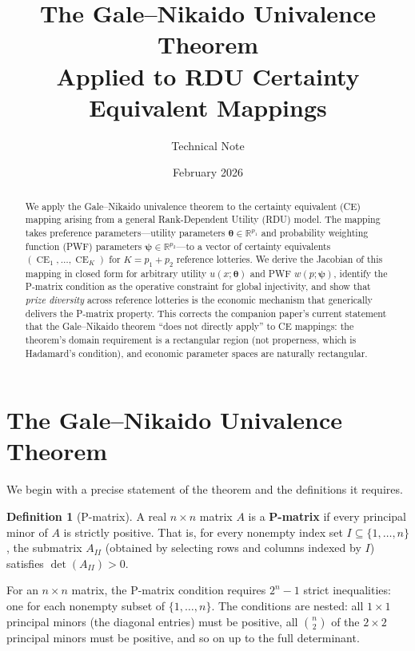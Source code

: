 \documentclass[11pt,a4paper]{article}
\title{The Gale--Nikaido Univalence Theorem\\
Applied to RDU Certainty Equivalent Mappings}
\author{Technical Note}
\date{February 2026}
\theoremstyle{definition}
\newtheorem{definition}[theorem]{Definition}
\newcommand{\R}{\mathbb{R}}
\newcommand{\btheta}{\boldsymbol{\theta}}
\newcommand{\bpsi}{\boldsymbol{\psi}}
\DeclareMathOperator{\CE}{CE}
\begin{document}
\maketitle

\begin{abstract}
We apply the Gale--Nikaido univalence theorem to the certainty equivalent
(CE) mapping arising from a general Rank-Dependent Utility (RDU) model.
The mapping takes preference parameters---utility parameters
$\btheta \in \R^{p_1}$ and probability weighting function (PWF) parameters
$\bpsi \in \R^{p_2}$---to a vector of certainty equivalents
$(\CE_1, \ldots, \CE_K)$ for $K = p_1 + p_2$ reference lotteries.
We derive the Jacobian of this mapping in closed form for arbitrary
utility $u(x;\btheta)$ and PWF $w(p;\bpsi)$, identify the P-matrix
condition as the operative constraint for global injectivity, and show
that \emph{prize diversity} across reference lotteries is the economic
mechanism that generically delivers the P-matrix property.
This corrects the companion paper's current statement that the
Gale--Nikaido theorem ``does not directly apply'' to CE mappings:
the theorem's domain requirement is a rectangular region (not
properness, which is Hadamard's condition), and economic parameter
spaces are naturally rectangular.
\end{abstract}

\tableofcontents
\newpage


\section{The Gale--Nikaido Univalence Theorem}
\label{sec:gn_theorem}

We begin with a precise statement of the theorem and the definitions it requires.

\begin{definition}[P-matrix]
\label{def:p_matrix}
A real $n \times n$ matrix $A$ is a \textbf{P-matrix} if every principal minor
of $A$ is strictly positive. That is, for every nonempty index set
$I \subseteq \{1, \ldots, n\}$, the submatrix $A_{II}$ (obtained by selecting
rows and columns indexed by $I$) satisfies $\det(A_{II}) > 0$.
\end{definition}

For an $n \times n$ matrix, the P-matrix condition requires $2^n - 1$ strict
inequalities: one for each nonempty subset of $\{1, \ldots, n\}$. The conditions
are nested: all $1 \times 1$ principal minors (the diagonal entries) must be
positive, all $\binom{n}{2}$ of the $2 \times 2$ principal minors must be
positive, and so on up to the full determinant.
\end{document}
